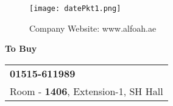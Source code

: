 \documentclass{article}
\begin{document}
\vspace*{\fill}
\begin{center}
  \begin{figure}
    \centering
    \texttt{[image: datePkt1.png]}
    \caption{Company Website: www.alfoah.ae}
  \end{figure}
  {\Huge\textbf{To Buy}}
\\
  \LARGE
\vspace{2cm}
  \begin{tabular}{l}
    \faPhone{} \textbf{01515-611989}\\
    \faHome{} Room - \textbf{1406}, Extension-1, SH Hall\\
  \end{tabular}
\end{center}
\vspace*{\fill}
 
\end{document}

